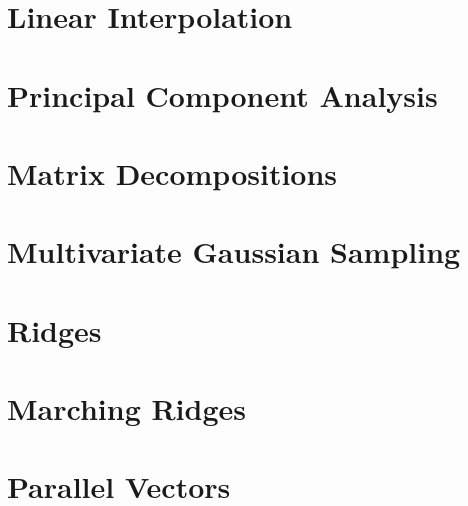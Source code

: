\section{Linear Interpolation}

\section{Principal Component Analysis}

\section{Matrix Decompositions}

\section{Multivariate Gaussian Sampling}

\section{Ridges}

\section{Marching Ridges}

\section{Parallel Vectors}

